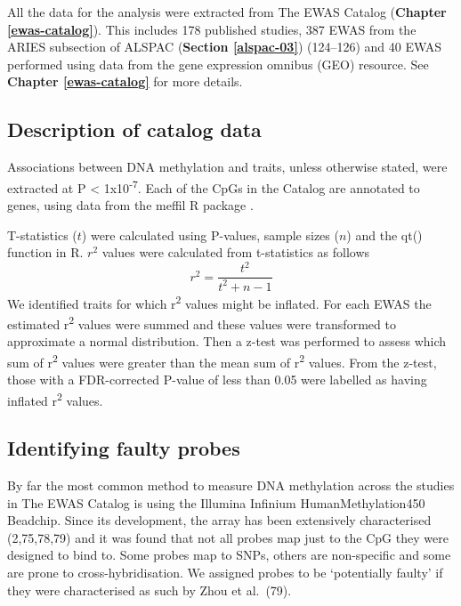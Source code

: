 \documentclass[11pt,oneside]{bristolthesis}
\begin{document}
All the data for the analysis were extracted from The EWAS Catalog (\textbf{Chapter \ref{ewas-catalog}}). This includes 178 published studies, 387 EWAS from the ARIES subsection of ALSPAC (\textbf{Section \ref{alspac-03}}) (124--126) and 40 EWAS performed using data from the gene expression omnibus (GEO) resource. See \textbf{Chapter \ref{ewas-catalog}} for more details.

\hypertarget{description-of-data}{%
\subsection*{Description of catalog data}\label{description-of-data}}

Associations between DNA methylation and traits, unless otherwise stated, were extracted at P \textless{} 1x10\textsuperscript{-7}. Each of the CpGs in the Catalog are annotated to genes, using data from the meffil R package .

T-statistics (\(t\)) were calculated using P-values, sample sizes (\(n\)) and the qt() function in R. \(r^2\) values were calculated from t-statistics as follows
\begin{equation}
    r^2 = \frac{t^2} {t^2 + n - 1}
    \label{eq:r-squared}
\end{equation}
We identified traits for which r\textsuperscript{2} values might be inflated. For each EWAS the estimated r\textsuperscript{2} values were summed and these values were transformed to approximate a normal distribution. Then a z-test was performed to assess which sum of r\textsuperscript{2} values were greater than the mean sum of r\textsuperscript{2} values. From the z-test, those with a FDR-corrected P-value of less than 0.05 were labelled as having inflated r\textsuperscript{2} values.

\hypertarget{identifying-faulty-probes}{%
\subsection{Identifying faulty probes}\label{identifying-faulty-probes}}

By far the most common method to measure DNA methylation across the studies in The EWAS Catalog is using the Illumina Infinium HumanMethylation450 Beadchip. Since its development, the array has been extensively characterised (2,75,78,79) and it was found that not all probes map just to the CpG they were designed to bind to. Some probes map to SNPs, others are non-specific and some are prone to cross-hybridisation. We assigned probes to be `potentially faulty' if they were characterised as such by Zhou et al.~(79).
\end{document}
